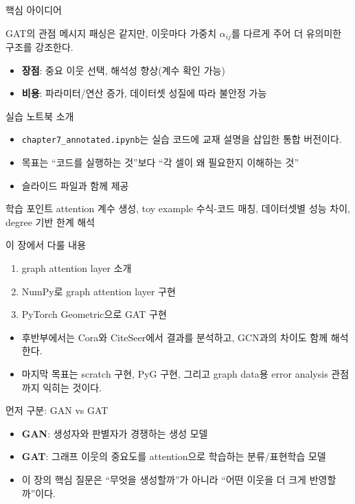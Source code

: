 \begin{frame}{핵심 아이디어}
\begin{block}{GAT의 관점}
메시지 패싱은 같지만, 이웃마다 가중치 $\alpha_{ij}$를 다르게 주어 더 유의미한 구조를 강조한다.
\end{block}
\vspace{0.4em}
\begin{itemize}
  \item \textbf{장점}: 중요 이웃 선택, 해석성 향상(계수 확인 가능)
  \item \textbf{비용}: 파라미터/연산 증가, 데이터셋 성질에 따라 불안정 가능
\end{itemize}
\end{frame}

\begin{frame}{실습 노트북 소개}
\begin{itemize}
  \item \texttt{chapter7\_annotated.ipynb}는 실습 코드에 교재 설명을 삽입한 통합 버전이다.
  \item 목표는 ``코드를 실행하는 것''보다 ``각 셀이 왜 필요한지 이해하는 것''
  \item 슬라이드 파일과 함께 제공
\end{itemize}
\vspace{0.4em}
\begin{block}{학습 포인트}
attention 계수 생성, toy example 수식-코드 매칭, 데이터셋별 성능 차이, degree 기반 한계 해석
\end{block}
\end{frame}

\begin{frame}{이 장에서 다룰 내용}
\begin{enumerate}
  \item graph attention layer 소개
  \item NumPy로 graph attention layer 구현
  \item PyTorch Geometric으로 GAT 구현
\end{enumerate}
\vspace{0.3em}
\begin{itemize}
  \item 후반부에서는 Cora와 CiteSeer에서 결과를 분석하고, GCN과의 차이도 함께 해석한다.
  \item 마지막 목표는 scratch 구현, PyG 구현, 그리고 graph data용 error analysis 관점까지 익히는 것이다.
\end{itemize}
\end{frame}

\begin{frame}{먼저 구분: GAN vs GAT}
\begin{itemize}
  \item \textbf{GAN}: 생성자와 판별자가 경쟁하는 생성 모델
  \item \textbf{GAT}: 그래프 이웃의 중요도를 attention으로 학습하는 분류/표현학습 모델
  \item 이 장의 핵심 질문은 ``무엇을 생성할까''가 아니라 ``어떤 이웃을 더 크게 반영할까''이다.
\end{itemize}
\end{frame}


